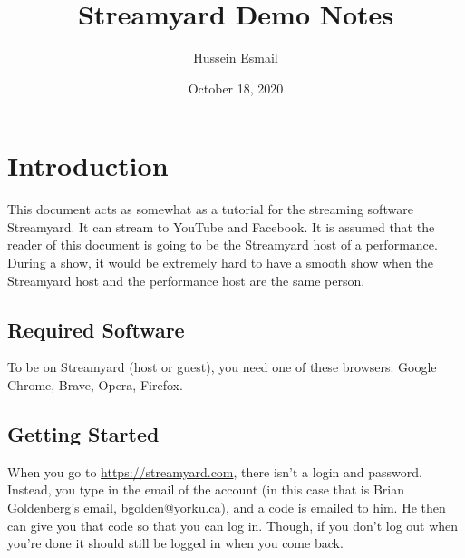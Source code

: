 \documentclass{article}
\title{Streamyard Demo Notes}
\author{Hussein Esmail}
\date{October 18, 2020} %
\begin{document}
\maketitle
\newpage
\begingroup
\hypersetup{linkcolor=black}
\tableofcontents
\endgroup
\newpage





\section{Introduction}
This document acts as somewhat as a tutorial for the streaming software Streamyard. It can stream to YouTube and Facebook. It is assumed that the reader of this document is going to be the Streamyard host of a performance. During a show, it would be extremely hard to have a smooth show when the Streamyard host and the performance host are the same person. 

\subsection{Required Software}
To be on Streamyard (host or guest), you need one of these browsers: Google Chrome, Brave, Opera, Firefox.

\subsection{Getting Started}
When you go to \href{https://streamyard.com}{https://streamyard.com}, there isn’t a login and password. Instead, you type in the email of the account (in this case that is Brian Goldenberg’s email, \href{mailto:bgolden@yorku.ca}{bgolden@yorku.ca}), and a code is emailed to him. He then can give you that code so that you can log in. Though, if you don’t log out when you’re done it should still be logged in when you come back.
\end{document}
